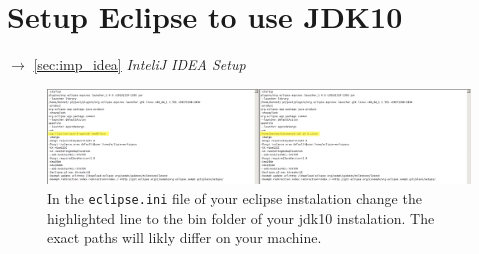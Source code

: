 \section{Setup Eclipse to use JDK10}
$\rightarrow$ \ref{sec:imp_idea} \textit{InteliJ IDEA Setup} 

\begin{figure}[H]
	\includegraphics[width=\textwidth]{setup-parts/pictures/eclipse-change-jdk.png}
	\caption{In the \texttt{eclipse.ini} file of your eclipse instalation change the highlighted line to the bin folder of your jdk10 instalation. The exact paths will likly differ on your machine.}
\end{figure}